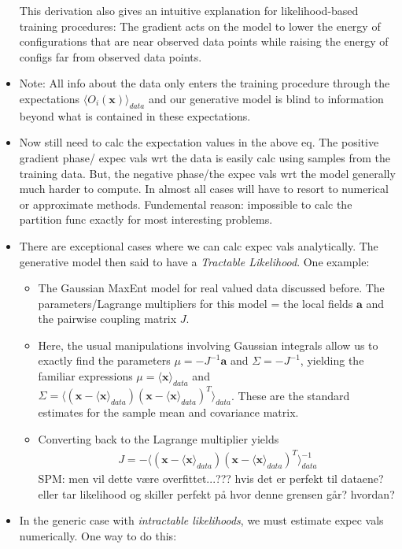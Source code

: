 \documentclass[norsk,a4paper,11pt]{article}
\begin{document}
\begin{itemize}
	This derivation also gives an intuitive explanation for likelihood-based training procedures: The gradient acts on the model to lower the energy of configurations that are near observed data points while raising the energy of configs far from observed data points. 
	\item Note: All info about the data only enters the training procedure through the expectations $\langle O_i(\bm{x}) \rangle_{data}$ and our generative model is blind to information beyond what is contained in these expectations.
	\item Now still need to calc the expectation values in the above eq. The positive gradient phase/ expec vals wrt the data is easily calc using samples from the training data. But, the negative phase/the expec vals wrt the model generally much harder to compute. In almost all cases will have to resort to numerical or approximate methods. Fundemental reason: impossible to calc the partition func exactly for most interesting problems.
	\item There are exceptional cases where we can calc expec vals analytically. The generative model then said to have a \textit{Tractable Likelihood}.
	One example:
	\begin{itemize}
		\item The Gaussian MaxEnt model for real valued data discussed before. The parameters/Lagrange multipliers for this model = the local fields $\bm{a}$ and the pairwise coupling matrix $J$. 
		\item Here, the usual manipulations involving Gaussian integrals allow us to exactly find the parameters $\mu = -J^{-1} \bm{a}$ and $\Sigma = -J^{-1}$, yielding the familiar expressions $\mu = \langle \bm{x} \rangle_{data}$ and $\Sigma = \langle (\bm{x} - \langle \bm{x} \rangle_{data})(\bm{x} - \langle \bm{x} \rangle_{data} )^T \rangle_{data}$. These are the standard estimates for the sample mean and covariance matrix. 
		\item Converting back to the Lagrange multiplier yields
		\begin{align}
			J = - \langle (\bm{x} - \langle \bm{x} \rangle_{data})(\bm{x} - \langle \bm{x} \rangle_{data} )^T \rangle_{data}^{-1}
		\end{align}
		SPM: men vil dette være overfittet...??? hvis det er perfekt til dataene? eller tar likelihood og skiller perfekt på hvor denne grensen går? hvordan?
	\end{itemize}  
	\item In the generic case with \textit{intractable likelihoods}, we must estimate expec vals numerically. One way to do this:

\end{itemize}
\end{document}
